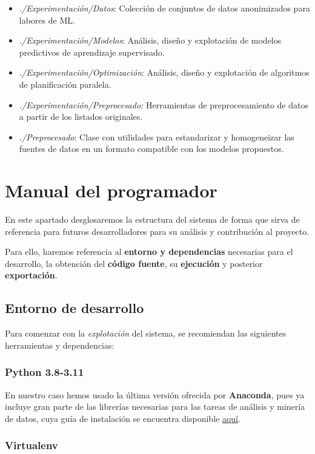 \begin{itemize}
    \item \textit{./Experimentación/Datos}: Colección de conjuntos de datos anonimizados para labores de ML.
    \item \textit{./Experimentación/Modelos}: Análisis, diseño y explotación de modelos predictivos de aprendizaje supervisado.
    \item \textit{./Experimentación/Optimización}: Análisis, diseño y explotación de algoritmos de planificación paralela.
    \item \textit{./Experimentación/Preprocesado:} Herramientas de preprocesamiento de datos a partir de los listados originales.
    \item \textit{./Preprocesado}: Clase con utilidades para estandarizar y homogeneizar las fuentes de datos en un formato compatible con los modelos propuestos.
\end{itemize}


\section{Manual del programador}

En este apartado desglosaremos la estructura del sistema de forma que sirva de referencia para futuros desarrolladores para su análisis y contribución al proyecto.

Para ello, haremos referencia al \textbf{entorno y dependencias} necesarias para el desarrollo, la obtención del \textbf{código fuente}, su \textbf{ejecución} y posterior \textbf{exportación}.

\subsection{Entorno de desarrollo}

Para comenzar con la \textit{explotación} del sistema, se recomiendan las siguientes herramientas y dependencias:

\subsubsection{Python 3.8-3.11}

En nuestro caso hemos usado la última versión ofrecida por \textbf{Anaconda}, pues ya incluye gran parte de las librerías necesarias para las tareas de análisis y minería de datos, cuya guía de instalación se encuentra disponible \href{https://docs.anaconda.com/free/anaconda/install/index.html}{aquí}.

\subsubsection{Virtualenv}

